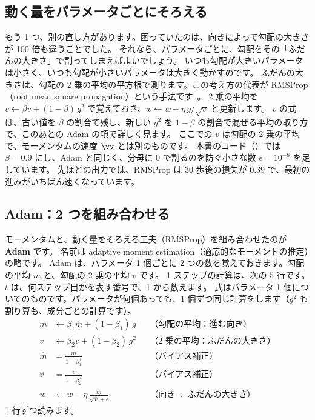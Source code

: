 \subsection*{動く量をパラメータごとにそろえる}

もう 1 つ、別の直し方があります。困っていたのは、向きによって勾配の大きさが 100 倍も違うことでした。
それなら、パラメータごとに、勾配をその「ふだんの大きさ」で割ってしまえばよいでしょう。
いつも勾配が大きいパラメータは小さく、いつも勾配が小さいパラメータは大きく動かすのです。
ふだんの大きさは、勾配の 2 乗の平均の平方根で測ります。この考え方の代表が RMSProp（root mean square propagation）という手法です~\cite{tieleman2012rmsprop}。
2 乗の平均を $v\leftarrow\beta v+(1-\beta)\,g^2$ で覚えておき、$w\leftarrow w-\eta\,g/\sqrt{v}$ と更新します。
$v$ の式は、古い値を $\beta$ の割合で残し、新しい $g^2$ を $1-\beta$ の割合で混ぜる平均の取り方で、このあとの Adam の項で詳しく見ます。
ここでの $v$ は勾配の 2 乗の平均で、モーメンタムの速度 $\vv$ とは別のものです。
本書のコード（）では $\beta=0.9$ にし、Adam と同じく、分母に 0 で割るのを防ぐ小さな数 $\epsilon=10^{-8}$ を足しています。
先ほどの出力では、RMSProp は 30 歩後の損失が 0.39 で、最初の進みがいちばん速くなっています。

\subsection*{Adam：2 つを組み合わせる}

モーメンタムと、動く量をそろえる工夫（RMSProp）を組み合わせたのが \textbf{Adam} です\cite{kingma2015adam}。
名前は adaptive moment estimation（適応的なモーメントの推定）の略です。
Adam は、パラメータ 1 個ごとに 2 つの数を覚えておきます。勾配の平均 $m$ と、勾配の 2 乗の平均 $v$ です。
1 ステップの計算は、次の 5 行です。$t$ は、何ステップ目かを表す番号で、1 から数えます。
式はパラメータ 1 個についてのものです。パラメータが何個あっても、1 個ずつ同じ計算をします（$g^2$ も割り算も、成分ごとの計算です）。
\begin{align}
m&\leftarrow\beta_1 m+(1-\beta_1)\,g &&\text{（勾配の平均：進む向き）}\label{eq:training-adam-m}\\
v&\leftarrow\beta_2 v+(1-\beta_2)\,g^2 &&\text{（2 乗の平均：ふだんの大きさ）}\label{eq:training-adam-v}\\
\hat m&=\frac{m}{1-\beta_1^{\,t}} &&\text{（バイアス補正）}\label{eq:training-adam-mhat}\\
\hat v&=\frac{v}{1-\beta_2^{\,t}} &&\text{（バイアス補正）}\label{eq:training-adam-vhat}\\
w&\leftarrow w-\eta\,\frac{\hat m}{\sqrt{\hat v}+\epsilon} &&\text{（向き $\div$ ふだんの大きさ）}\label{eq:training-adam-w}
\end{align}
1 行ずつ読みます。

